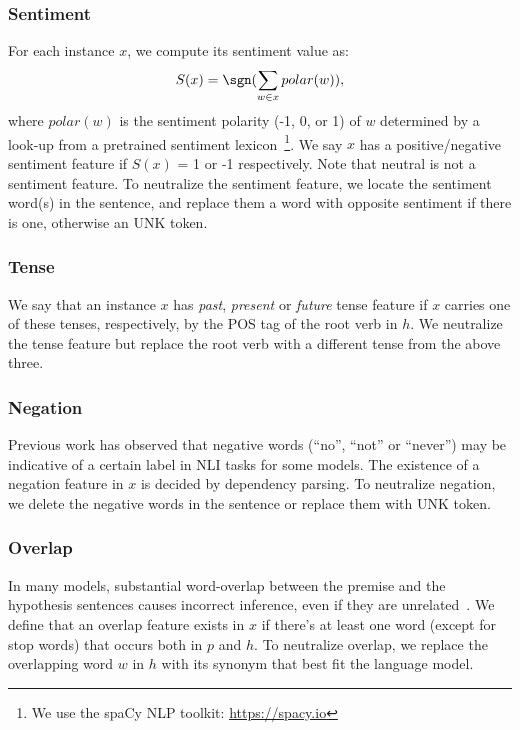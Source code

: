 \subsubsection{Sentiment}
For each instance $x$, we compute its sentiment value as:
\begin{equation}
S(x) = \sgn(\sum_{w \in x} polar(w)),
\end{equation}
where $polar(w)$ is the sentiment polarity (-1, 0, or 1)
of $w$ determined by a look-up from a pretrained sentiment 
lexicon~\footnote{We use the spaCy NLP toolkit: \url{https://spacy.io}}.
We say $x$ has a positive/negative sentiment feature if $S(x)$ = 1 or -1 
respectively. Note that neutral is not a sentiment feature.
To neutralize the sentiment feature, we locate the sentiment word(s) in the
sentence, and replace them a word with opposite sentiment if there is one, otherwise
an UNK token.

\subsubsection{Tense}
We say that an instance $x$ has  
\textit{past}, \textit{present} or \textit{future} tense feature if $x$
carries one of these tenses, respectively, by the POS tag of the root verb
in $h$. We neutralize the tense feature but replace the root verb with
a different tense from the above three.

\subsubsection{Negation}
Previous work has observed that negative words (``no'', ``not'' or ``never'') 
may be indicative of a certain label in NLI tasks for some models.
The existence of a negation feature in $x$ is decided by dependency 
parsing. 
To neutralize negation, we delete the negative words in the sentence or
replace them with UNK token.

\subsubsection{Overlap}
In many models, substantial word-overlap between the premise and the
hypothesis sentences causes incorrect inference, 
even if they are unrelated~\cite{mccoy2019right}. 
We define that an overlap feature exists in $x$ if there's at least one word
(except for stop words) that occurs both in $p$ and $h$. 
To neutralize overlap, we replace the overlapping word $w$ in $h$ with its synonym that best
fit the language model.

